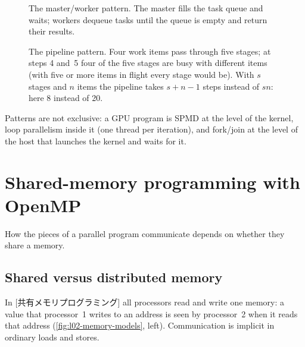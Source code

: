 \documentclass[../main.tex]{subfiles}
\begin{document}
\begin{figure}[tb]
  \centering
  
  \caption{The master/worker pattern.  The master fills the task queue
    and waits; workers dequeue tasks until the queue is empty and return
    their results.}
  \label{fig:l02-master-worker}
\end{figure}

\begin{marginfigure}
  \resizebox{\linewidth}{!}{}
  \caption{The fork/join pattern: one flow of control forks into four
    parallel tasks and joins again.}
  \label{fig:l02-fork-join}
\end{marginfigure}

\begin{figure}[tb]
  \centering
  
  \caption{The pipeline pattern.  Four work items pass through five
    stages; at steps 4 and~5 four of the five stages are busy with
    different items (with five or more items in flight every stage would
    be).  With $s$ stages and $n$ items the pipeline takes $s+n-1$ steps
    instead of $sn$: here 8 instead of 20.}
  \label{fig:l02-pipeline}
\end{figure}

\begin{keypoint}
  Patterns are not exclusive: a GPU program is SPMD at the level of the
  kernel, loop parallelism inside it (one thread per iteration), and
  fork/join at the level of the host that launches the kernel and waits
  for it.
\end{keypoint}

\section{Shared-memory programming with OpenMP}
\label{sec:l02-openmp}

How the pieces of a parallel program communicate depends on whether they
share a memory.

\subsection{Shared versus distributed memory}

\begin{definition}
  In [共有メモリプログラミング] all
  processors read and write one memory: a value that processor~1 writes to
  an address is seen by processor~2 when it reads that address
  (\cref{fig:l02-memory-models}, left).  Communication is implicit in
  ordinary loads and stores.
\end{definition}
\end{document}

